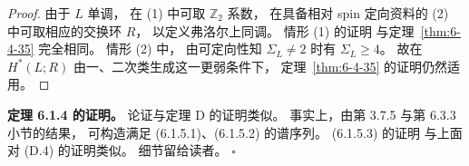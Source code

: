 \begin{proof}
由于 $L$ 单调，
在 \textup{(1)} 中可取
$\mathbb Z_2$ 系数，
在具备相对 spin 定向资料的
\textup{(2)} 中可取相应的交换环 $R$，
以定义弗洛尔上同调。
情形 \textup{(1)} 的证明
与定理~\ref{thm:6-4-35} 完全相同。
情形 \textup{(2)} 中，
由可定向性知
$\Sigma_L\ne2$ 时有 $\Sigma_L\ge4$。
故在 $H^*(L;R)$
由一、二次类生成这一更弱条件下，
定理~\ref{thm:6-4-35} 的证明仍然适用。
\end{proof}

\noindent\textbf{定理 6.1.4 的证明。}
论证与定理 D 的证明类似。
事实上，由第 3.7.5
与第 6.3.3 小节的结果，
可构造满足 (6.1.5.1)、(6.1.5.2)
的谱序列。
(6.1.5.3) 的证明
与上面对 \textup{(D.4)} 的证明类似。
细节留给读者。
\hfill$\square$
